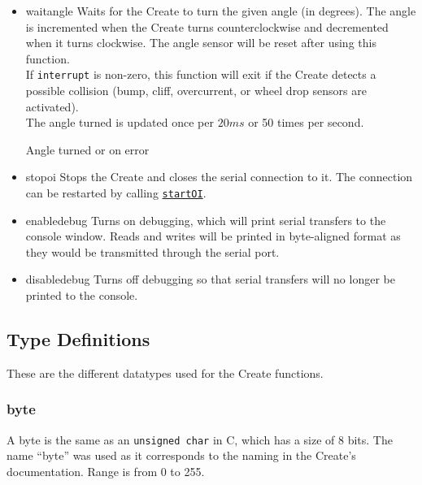 \documentclass {article}
\begin{document}
\begin {itemize}
   \item {} {waitangle}
         Waits for the Create to turn the given angle (in degrees).  The angle is incremented when
         the Create turns counterclockwise and decremented when it turns clockwise.  The angle
         sensor will be reset after using this function.  \\
         If {\tt interrupt} is non-zero, this function will exit if the Create detects a possible
         collision (bump, cliff, overcurrent, or wheel drop sensors are activated). \\
         The angle turned is updated once per $20ms$ or 50 times per second. \\
         \ret Angle turned or \fail on error

   \item {} {stopoi}
         Stops the Create and closes the serial connection to it.  The connection can be restarted
         by calling \hyperlink {startoi}{{\tt startOI}}. \\
         \retnorm

   \item {} {enabledebug}
         Turns on debugging, which will print serial transfers to the console window.  Reads
         and writes will be printed in byte-aligned format as they would be transmitted through the
         serial port.

   \item {} {disabledebug}
         Turns off debugging so that serial transfers will no longer be printed to the console.
\end {itemize}

\subsection {Type Definitions} \hypertarget{datatypes}{} 
These are the different datatypes used for the Create functions.

\subsubsection {byte} \hypertarget{oibyte}{}
A byte is the same as an {\tt unsigned char} in C, which has a size of 8 bits.  The name ``byte''
was used as it corresponds to the naming in the Create's documentation.  Range is from 0 to 255.
\end{document}
